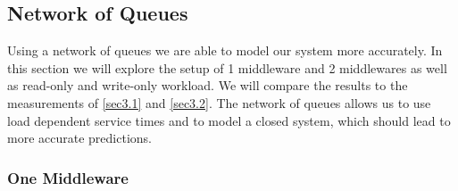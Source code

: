 \documentclass[11pt,a4paper]{article}
\begin{document}
\subsection{Network of Queues} \label{sec7.3}
Using a network of queues we are able to model our system more accurately. In this section we will explore the setup of 1 middleware and 2 middlewares as well as read-only and write-only workload. We will compare the results to the measurements of \autoref{sec3.1} and \autoref{sec3.2}. The network of queues allows us to use load dependent service times and to model a closed system, which should lead to more accurate predictions.
\subsubsection{One Middleware}
\end{document}
